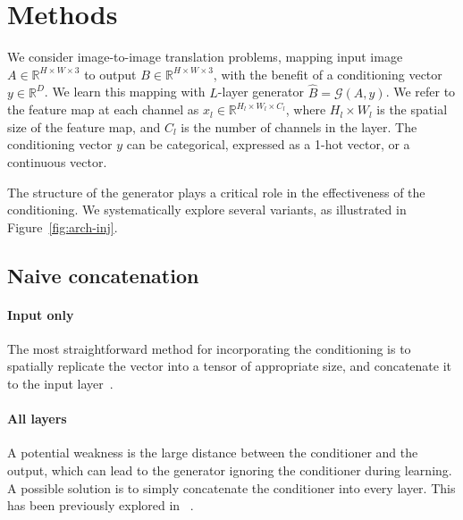 

\section{Methods}

We consider image-to-image translation problems, mapping input image $A \in \mathds{R}^{H\times W\times 3}$ to output $B \in \mathds{R}^{H\times W\times 3}$, with the benefit of a conditioning vector $y \in \mathds{R}^{D}$. We learn this mapping with $L$-layer generator $\widehat{B}=\mathcal{G}(A,y)$. We refer to the feature map at each channel as $x_l\in \mathds{R}^{H_l\times W_l\times C_l}$, where $H_l \times W_l$ is the spatial size of the feature map, and $C_l$ is the number of channels in the layer.
The conditioning vector $y$ can be categorical, expressed as a 1-hot vector, or a continuous vector.


The structure of the generator plays a critical role in the effectiveness of the conditioning. We systematically explore several variants, as illustrated in Figure~\ref{fig:arch-inj}.

\subsection{Naive concatenation}

\paragraph{Input only} The most straightforward method for incorporating the conditioning is to spatially replicate the vector into a tensor of appropriate size, and concatenate it to the input layer~\cite{XX,XX}.

\paragraph{All layers} A potential weakness is the large distance between the conditioner and the output, which can lead to the generator ignoring the conditioner during learning. A possible solution is to simply concatenate the conditioner into every layer. This has been previously explored in ~\cite{zhu2017toward}.

